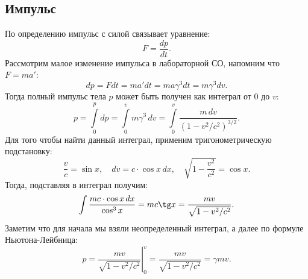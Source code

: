 \subsection{Импульс}
По определению импульс с силой связывает уравнение:
\begin{equation*}
	F = \frac{dp}{dt}.
\end{equation*}
Рассмотрим малое изменение импульса в лабораторной СО, напомним что $F = ma'$:
\begin{equation*}
	dp = F dt = m a' dt = m a \gamma^{3} dt = m \gamma^{3} dv.
\end{equation*}
Тогда полный импульс тела $p$ может быть получен как интеграл от 0 до $v$:
\begin{equation*}
	p = \int\limits_0^{p} dp = \int\limits_0^{v} m \gamma^{3} \,dv = \int\limits_0^{v} \frac{m \, dv}{\left(1 - v^2 / c^2\right)^{3/2}}.
\end{equation*}
Для того чтобы найти данный интеграл, применим тригонометрическую подстановку:
\begin{equation}
	\frac{v}{c} = \sin x, \quad dv = c \cdot \cos x \, dx, \quad \sqrt{1-\frac{v^2}{c^2}} = \cos x.
	\label{eq:sr-imp-trigsub}
\end{equation}
Тогда, подставляя в интеграл получим:
\begin{equation*}
	\int\limits \frac{mc \cdot \cos x \, dx}{\cos^{3} x} = mc \tg x = \frac{mv}{\sqrt{1-v^2/c^2}}.
\end{equation*}
Заметим что для начала мы взяли неопределенный интеграл, а далее по формуле Ньютона-Лейбница:
\begin{equation*}
	p=\left.\frac{m v}{\sqrt{1-v^2 / c^2}}\right|_0 ^v = \frac{mv}{\sqrt{1-v^2/c^2}} = \gamma m v.
\end{equation*}